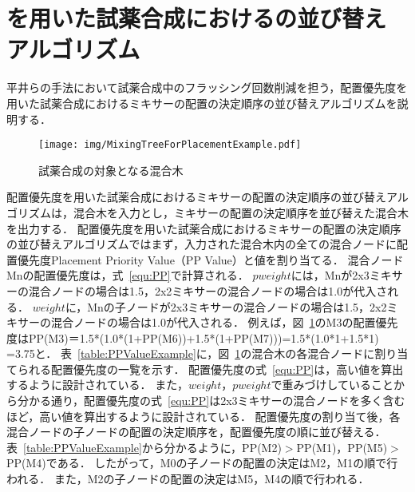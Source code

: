 \section{を用いた試薬合成におけるの並び替えアルゴリズム}
平井らの手法において試薬合成中のフラッシング回数削減を担う，配置優先度を用いた試薬合成におけるミキサーの配置の決定順序の並び替えアルゴリズムを説明する．


\begin{figure}[tbp]
    \centering\texttt{[image: img/MixingTreeForPlacementExample.pdf]}
 \caption{試薬合成の対象となる混合木}\label{fig:placementTree}
\end{figure}

配置優先度を用いた試薬合成におけるミキサーの配置の決定順序の並び替えアルゴリズムは，混合木を入力とし，ミキサーの配置の決定順序を並び替えた混合木を出力する．
配置優先度を用いた試薬合成におけるミキサーの配置の決定順序の並び替えアルゴリズムではまず，入力された混合木内の全ての混合ノードに配置優先度Placement Priority Value（PP Value）と値を割り当てる．
混合ノードMnの配置優先度は，式~\eqref{equ:PP}で計算される．
$pweight$には，Mnが2x3ミキサーの混合ノードの場合は1.5，2x2ミキサーの混合ノードの場合は1.0が代入される．
$weight$に，Mnの子ノードが2x3ミキサーの混合ノードの場合は1.5，2x2ミキサーの混合ノードの場合は1.0が代入される．
例えば，図~\ref{fig:placementTree}のM3の配置優先度はPP(M3)＝1.5*(1.0*(1+PP(M6))+1.5*(1+PP(M7)))=1.5*(1.0*1+1.5*1) =3.75と．
表~\ref{table:PPValueExample}に，図~\ref{fig:placementTree}の混合木の各混合ノードに割り当てられる配置優先度の一覧を示す．
配置優先度の式~\eqref{equ:PP}は，高い値を算出するように設計されている．
また，$weight，pweight$で重みづけしていることから分かる通り，配置優先度の式~\eqref{equ:PP}は2x3ミキサーの混合ノードを多く含むほど，高い値を算出するように設計されている．
配置優先度の割り当て後，各混合ノードの子ノードの配置の決定順序を，配置優先度の順に並び替える．
表~\ref{table:PPValueExample}から分かるように，PP(M2)$>$PP(M1)，PP(M5)$>$PP(M4)である．
したがって，M0の子ノードの配置の決定はM2，M1の順で行われる．
また，M2の子ノードの配置の決定はM5，M4の順で行われる．


